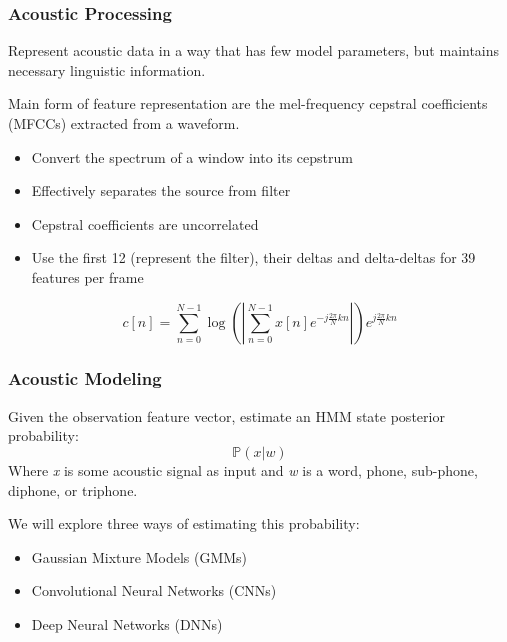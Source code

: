 \documentclass[notes]{beamer}
\newcommand{\cprob}[2]{ \prob{#1 \lvert #2} }
\newcommand{\prob}[1]{\mathbb{P}\left( #1 \right)}
\begin{document}
\begin{frame}
	\frametitle{Acoustic Processing}
	\begin{center}
		Represent acoustic data in a way that has few model parameters, but maintains necessary linguistic information.
	\end{center}
	\begin{center}
		Main form of feature representation are the mel-frequency cepstral coefficients (MFCCs) extracted from a waveform.
	\end{center}
	
	\begin{itemize}
		\item Convert the spectrum of a window into its cepstrum
		\item Effectively separates the source from filter
		\item Cepstral coefficients are uncorrelated
		\item Use the first 12 (represent the filter), their deltas and delta-deltas for 39 features per frame
	\end{itemize}
	
	\begin{equation*}
		c[n] = \sum_{n=0}^{N-1}\log(|\sum_{n=0}^{N-1}x[n]e^{-j\frac{2\pi}{N}kn}|)e^{j\frac{2\pi}{N}kn}
	\end{equation*}
\end{frame}

\begin{frame}
	\frametitle{Acoustic Modeling}
	\begin{center}
		Given the observation feature vector, estimate an HMM state posterior probability: \begin{equation*}
		\cprob{x}{w}\end{equation*} Where \textit{x} is some acoustic signal as input and \textit{w} is a word, phone, sub-phone, diphone, or triphone. 
	\end{center}
	
	We will explore three ways of estimating this probability:
	\begin{itemize}
		\item Gaussian Mixture Models (GMMs)
		\item Convolutional Neural Networks (CNNs)
		\item Deep Neural Networks (DNNs)
	\end{itemize}
\end{frame}
\end{document}
